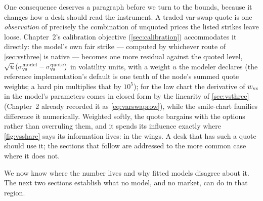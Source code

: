 One consequence deserves a paragraph before we turn to the bounds,
because it changes how a desk should read the instrument.  A traded
var-swap quote is one \emph{observation} of precisely the combination
of unquoted prices the listed strikes leave loose.  Chapter~2's
calibration objective (\cref{sec:calibration}) accommodates it
directly: the model's own fair strike --- computed by whichever route
of \cref{sec:vsthree} is native --- becomes one more residual against
the quoted level, $\sqrt{u}\,(\sigma_{\rm vs}^{\rm model}-\sigma_{\rm
vs}^{\rm quote})$ in volatility units, with a weight $u$ the modeler
declares (the reference implementation's default is one tenth of the
node's summed quote weights; a hard pin multiplies that by $10^{5}$);
for the law chart the derivative of $w_{\rm vs}$ in the model's
parameters comes in closed form by the linearity of \cref{sec:vsthree}
(Chapter~2 already recorded it as \cref{eq:varswaprow}), while the
smile-chart families difference it numerically.  Weighted
softly, the quote bargains with the options rather than overruling
them, and it spends its influence exactly where \cref{fig:vsshare}
says its information lives: in the wings.  A desk that has such a
quote should use it; the sections that follow are addressed to the
more common case where it does not.

We now know where the number lives and why fitted models disagree
about it.  The next two sections establish what no model, and no
market, can do in that region.
